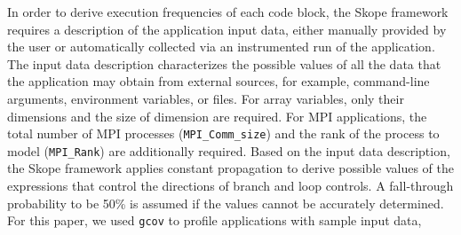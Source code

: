 In order to derive execution frequencies of each code block, the Skope framework requires a description of the application input data,
either manually provided by the user or automatically collected via an instrumented run of the application.
The input data description characterizes the possible values of all the data that the application may obtain from external sources,
for example, command-line arguments, environment variables, or files.
For array variables, only their dimensions and the size of dimension are required.
For MPI applications, the total number of MPI processes (\texttt{MPI\_Comm\_size}) and the rank of the process to model (\texttt{MPI\_Rank}) are additionally required.
Based on the input data description, the Skope framework applies constant propagation to derive possible values of the expressions that
control the directions of branch and loop controls. A fall-through probability to be 50\% is assumed if the values cannot be accurately determined.
For this paper, we used \texttt{gcov} to profile applications with sample input data,


